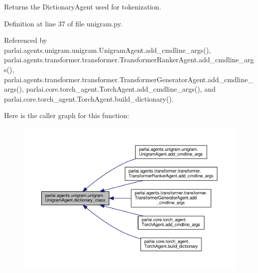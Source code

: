 \begin{DoxyVerb}Returns the DictionaryAgent used for tokenization.
\end{DoxyVerb}
 

Definition at line 37 of file unigram.\+py.



Referenced by parlai.\+agents.\+unigram.\+unigram.\+Unigram\+Agent.\+add\+\_\+cmdline\+\_\+args(), parlai.\+agents.\+transformer.\+transformer.\+Transformer\+Ranker\+Agent.\+add\+\_\+cmdline\+\_\+args(), parlai.\+agents.\+transformer.\+transformer.\+Transformer\+Generator\+Agent.\+add\+\_\+cmdline\+\_\+args(), parlai.\+core.\+torch\+\_\+agent.\+Torch\+Agent.\+add\+\_\+cmdline\+\_\+args(), and parlai.\+core.\+torch\+\_\+agent.\+Torch\+Agent.\+build\+\_\+dictionary().

Here is the caller graph for this function\+:
\nopagebreak
\begin{figure}[H]
\begin{center}
\leavevmode
\includegraphics[width=350pt]{classparlai_1_1agents_1_1unigram_1_1unigram_1_1UnigramAgent_a832c1e669ba04ca3c6258216cc82bdca_icgraph}
\end{center}
\end{figure}
\mbox{\label{classparlai_1_1agents_1_1unigram_1_1unigram_1_1UnigramAgent_a0688b7cf7ef26834f8ff11f0893fa45b}} 
